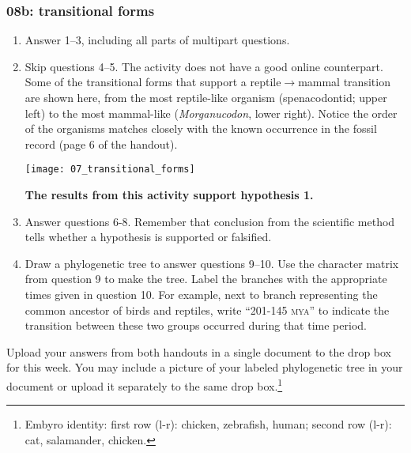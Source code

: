 \documentclass[12pt]{exam}
\begin{document}
\subsubsection*{08b: transitional forms}

\begin{enumerate}

\item Answer 1–3, including all parts of multipart questions.

\item Skip questions 4–5. The activity does not have a good online counterpart. Some of the transitional forms that support a reptile$\rightarrow$mammal transition are shown here, from the most reptile-like organism (spenacodontid; upper left) to the most mammal-like (\emph{Morganucodon}, lower right). Notice the order of the organisms matches closely with the known occurrence in the fossil record (page 6 of the handout).

\texttt{[image: 07\_transitional\_forms]}

\textbf{The results from this activity support hypothesis 1.}

\item Answer questions 6-8. Remember that conclusion from the scientific method tells whether a hypothesis is supported or falsified.

\item Draw a phylogenetic tree to answer questions 9–10. Use the character matrix from question 9 to make the tree. Label the branches with the appropriate times given in question 10. For example, next to branch representing the common ancestor of birds and reptiles, write “201-145 \textsc{mya}” to indicate the transition between these two groups occurred during that time period.
\end{enumerate}

Upload your answers from both handouts in a single document to the drop box for this week. You may include a picture of your labeled phylogenetic tree in your document or upload it separately to the same drop box.\footnote{Embyro identity: first row (l-r): chicken, zebrafish, human; second row (l-r): cat, salamander, chicken.}
\end{document}
